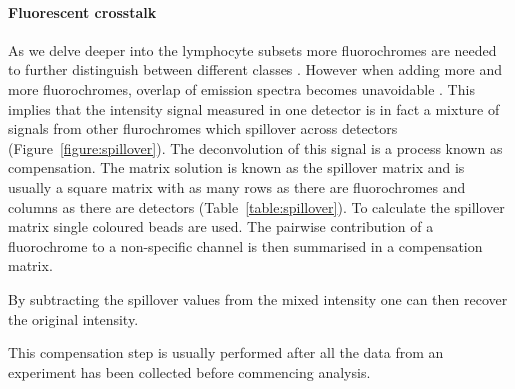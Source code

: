 \paragraph{Fluorescent crosstalk}
As we delve deeper into the lymphocyte subsets more fluorochromes are needed to further distinguish between different classes \citep{Perfetto:2004cy}.
However when adding more and more fluorochromes, overlap of emission spectra becomes unavoidable \citep{Roederer:2001vi}.
This implies that the intensity signal measured in one detector is in fact a mixture of signals from other flurochromes which spillover across detectors (Figure~\ref{figure:spillover}).
The deconvolution of this signal is a process known as compensation.
The matrix solution is known as the spillover matrix and is usually a square matrix with as many rows as there are fluorochromes and columns as there are detectors
(Table~\ref{table:spillover}).
To calculate the spillover matrix single coloured beads are used. 
The pairwise contribution of a fluorochrome to a non-specific channel is then summarised in a compensation matrix.


By subtracting the spillover values from the mixed intensity one can then recover the original intensity.

This compensation step is usually performed after all the data from an experiment has been collected before commencing analysis.



